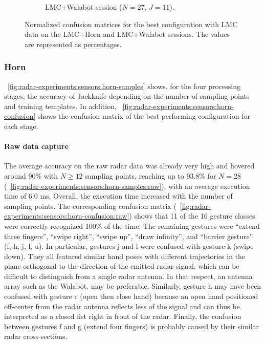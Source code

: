 \begin{figure}[t]
\begin{subfigure}{.49\textwidth}
        \vspace{-16pt}
        \captionsetup{width=.99\linewidth}
        \caption{LMC+Walabot session ($N{=}27$, $J{=}11$).}
        \label{fig:radar-experiments:sensors:lmc-confusion:walabot}
    \end{subfigure}
    \caption{Normalized confusion matrices for the best configuration with LMC data on the LMC+Horn and LMC+Walabot sessions. The values are represented as percentages.}
    \label{fig:radar-experiments:sensors:lmc-confusion}
\end{figure}


\subsubsection{Horn} \label{sec:radar-experiments:sensors:results:horn}
\fig~\ref{fig:radar-experiments:sensors:horn-samples} shows, for the four processing stages, the accuracy of Jackknife depending on the number of sampling points and training templates. In addition, \fig~\ref{fig:radar-experiments:sensors:horn-confusion} shows the confusion matrix of the best-performing configuration for each stage.


\paragraph{Raw data capture}
The average accuracy on the raw radar data was already very high and hovered around 90\% with $N{\ge}12$ sampling points, reaching up to 93.8\% for $N{=}28$ (\fig~\ref{fig:radar-experiments:sensors:horn-samples:raw}), with an average execution time of 6.0 ms. Overall, the execution time increased with the number of sampling points. 
%
The corresponding confusion matrix (\fig~\ref{fig:radar-experiments:sensors:horn-confusion:raw}) shows that 11 of the 16 gesture classes were correctly recognized 100\% of the time. The remaining gestures were ``extend three fingers'', ``swipe right'', ``swipe up'', ``draw infinity'', and ``barrier gesture'' (f, h, j, l, u). 
%
In particular, gestures j and l were confused with gesture k (swipe down). They all featured similar hand poses with different trajectories in the plane orthogonal to the direction of the emitted radar signal, which can be difficult to distinguish from a single radar antenna. In that respect, an antenna array such as the Walabot, may be preferable.
%
Similarly, gesture h may have been confused with gesture c (open then close hand) because an open hand positioned off-center from the radar antenna reflects less of the signal and can thus be interpreted as a closed fist right in front of the radar.
%
Finally, the confusion between gestures f and g (extend four fingers) is probably caused by their similar radar cross-sections.


